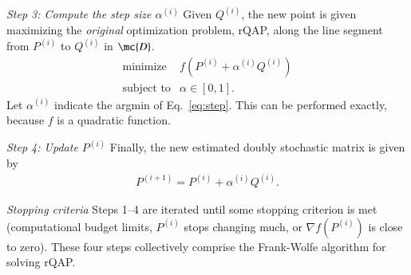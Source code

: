 \documentclass[preprint,11pt]{elsarticle}
\begin{document}
\emph{Step 3: Compute the step size $\alpha^{(i)}$} Given $Q^{(i)}$, the new point is given maximizing the \emph{original} optimization problem, rQAP, along the line segment from $P^{(i)}$ to $Q^{(i)}$ in $\mc{D}$.    
% 
% 
% 
\begin{equation}
\begin{array}{cl}
			\text{minimize}   & f(P^{(i)} + \alpha^{(i)} Q^{(i)}) \\
			\text{subject to}  & \alpha \in [0,1].   
\end{array} \label{eq:step}
\end{equation}
Let $\alpha^{(i)}$ indicate the argmin of Eq.~\eqref{eq:step}.
This can be performed exactly, because $f$ is a quadratic function.  


\emph{Step 4: Update $P^{(i)}$} Finally, the new estimated doubly stochastic matrix is given by
\begin{align} \label{eq:update}
	P^{(i+1)} = P^{(i)} + \alpha^{(i)} Q^{(i)}.
\end{align}


\emph{Stopping criteria} Steps 1--4 are iterated until some stopping criterion is met (computational budget limits, $P^{(i)}$ stops changing much, or $\nabla f(P^{(i)})$ is close to zero).  These four steps collectively comprise the Frank-Wolfe algorithm for solving rQAP.  %
\end{document}
